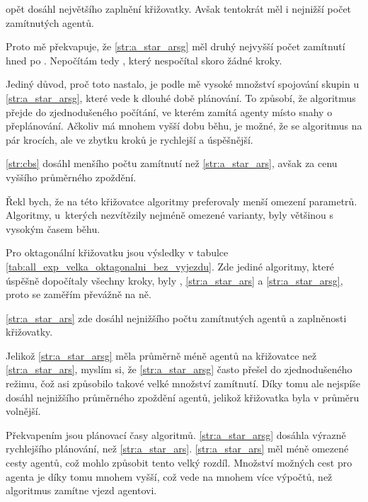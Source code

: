  opět dosáhl největšího zaplnění křižovatky.
Avšak tentokrát měl i nejnižší počet zamítnutých agentů.

Proto mě překvapuje, že \ref{str:a_star_arsg} měl druhý nejvyšší počet zamítnutí hned po .
Nepočítám tedy , který nespočítal skoro žádné kroky.

Jediný důvod, proč toto nastalo, je podle mě vysoké množství spojování skupin u \ref{str:a_star_arsg},
které vede k dlouhé době plánování.
To způsobí, že algoritmus přejde do zjednodušeného počítání, ve kterém zamítá agenty místo snahy o přeplánování.
Ačkoliv  má mnohem vyšší dobu běhu, je možné, že se algoritmus 
na pár krocích, ale ve zbytku kroků je rychlejší a úspěšnější.

\ref{str:cbs} dosáhl menšího počtu zamítnutí než \ref{str:a_star_ars}, avšak za cenu vyššího průměrného zpoždění.

Řekl bych, že na této křižovatce algoritmy preferovaly menší omezení parametrů.
Algoritmy, u~kterých nezvítězily nejméně omezené varianty, byly většinou s vysokým časem běhu.



Pro oktagonální křižovatku jsou výsledky v tabulce \ref{tab:all_exp_velka_oktagonalni_bez_vyjezdu}.
Zde jediné algoritmy, které úspěšně dopočítaly všechny kroky, byly
, \ref{str:a_star_ars} a \ref{str:a_star_arsg}, proto se zaměřím převážně na ně.

\ref{str:a_star_ars} zde dosáhl nejnižšího počtu zamítnutých agentů a zaplněnosti křižovatky.

Jelikož \ref{str:a_star_arsg} měla průměrně méně agentů na křižovatce než \ref{str:a_star_ars}, myslím si,
že \ref{str:a_star_arsg} často přešel do zjednodušeného režimu, čož asi způsobilo takové velké množství zamítnutí.
Díky tomu ale nejspíše dosáhl nejnižšího průměrného zpoždění agentů, jelikož křižovatka byla v průměru volnější.

Překvapením jsou plánovací časy algoritmů.
\ref{str:a_star_arsg} dosáhla výrazně rychlejšího plánování, než \ref{str:a_star_ars}.
\ref{str:a_star_ars} měl méně omezené cesty agentů, což mohlo způsobit tento velký rozdíl.
Množství možných cest pro agenta je díky tomu mnohem vyšší, což vede na mnohem více výpočtů,
než algoritmus zamítne vjezd agentovi.




